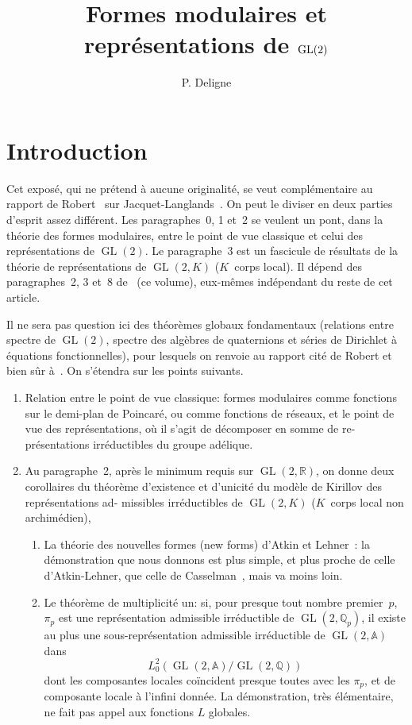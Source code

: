 \documentclass[11pt,a4paper]{amsart}
\title{Formes modulaires et repr\'esentations de $\GL(2)$}
\author{P. Deligne}
\date{}
\theoremstyle{plain}
\theoremstyle{definition}
\theoremstyle{remark}
\DeclareMathOperator{\GL}{GL}
\newcommand{\QQ}{\mathbb{Q}}
\newcommand{\RR}{\mathbb{R}}
\newcommand{\Af}{\mathbb{A}}
\begin{document}
\maketitle
\thispagestyle{empty}

\section*{Introduction}

Cet expos\'e, qui ne pr\'etend \`a aucune originalit\'e, se veut compl\'ementaire
au rapport de Robert~\cite{Robert} sur Jacquet-Langlands~\cite{JL}. On peut le diviser en deux
parties d'esprit assez diff\'erent. Les paragraphes~0, 1 et~2 se veulent un pont, dans
la th\'eorie des formes modulaires, entre le point de vue classique et celui des
repr\'esentations de $\GL(2)$. Le paragraphe~3 est un fascicule de r\'esultats de la th\'eorie
de repr\'esentations de $\GL(2,K)$ ($K$~corps local). Il d\'epend des paragraphes~2, 3
et~8 de~\cite{Deligne} (ce volume), eux-m\^emes ind\'ependant du reste de cet article.

Il ne sera pas question ici des th\'eor\`emes globaux fondamentaux (relations
entre spectre de $\GL(2)$, spectre des alg\`ebres de quaternions et s\'eries de Dirichlet
\`a \'equations fonctionnelles), pour lesquels on renvoie au rapport cit\'e de Robert et
bien s\^ur \`a~\cite{JL}. On s'\'etendra sur les points suivants.

\begin{enumerate}
\item[(A)] Relation entre le point de vue classique: formes modulaires comme fonctions
sur le demi-plan de Poincar\'e, ou comme fonctions de r\'eseaux, et le point de vue des
repr\'esentations, o\`u il s'agit de d\'ecomposer en somme de re-
pr\'esentations irr\'eductibles du groupe ad\'elique.

\item[(B)] Au paragraphe~2, apr\`es le minimum requis sur $\GL(2,\RR)$, on donne deux corollaires
du th\'eor\`eme d'existence et d'unicit\'e du mod\`ele de Kirillov des repr\'esentations ad-
missibles irr\'eductibles de $\GL(2,K)$ ($K$~corps local non archim\'edien),

\begin{enumerate}
\item[(a)] La th\'eorie des nouvelles formes (new forms) d'Atkin et Lehner~\cite{AtkinLehner}: la d\'emonstration
que nous donnons est plus simple, et plus proche de celle d'Atkin-Lehner, que celle
de Casselman~\cite{Casselman}, mais va moins loin.

\item[(b)] Le th\'eor\`eme de multiplicit\'e un: si, pour presque tout nombre premier~$p$, $\pi_p$
est une repr\'esentation admissible irr\'eductible de $\GL(2,\QQ_p)$, il existe au plus
une sous-repr\'esentation admissible irr\'eductible de $\GL(2,\Af)$ dans
\[ L^2_0(\GL(2,\Af)/\GL(2,\QQ)) \]
dont les composantes locales co\" incident presque toutes avec les $\pi_p$, et de composante locale \`a l'infini donn\'ee. La d\'emonstration, tr\`es \'el\'ementaire, ne fait pas appel aux fonctions $L$ globales.
\end{enumerate}
\end{enumerate}
\end{document}
